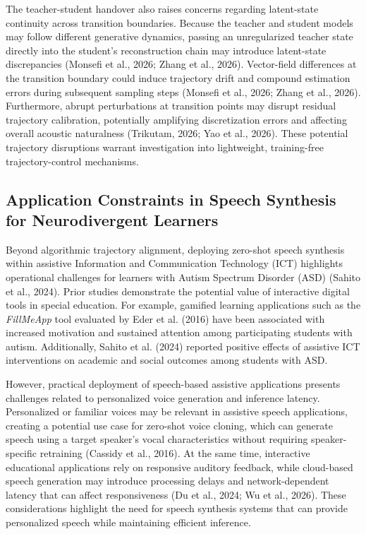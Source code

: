 \documentclass[12pt,a4paper,oneside]{report}
\begin{document}
The teacher-student handover also raises concerns regarding latent-state continuity across transition boundaries. Because the teacher and student models may follow different generative dynamics, passing an unregularized teacher state directly into the student's reconstruction chain may introduce latent-state discrepancies (Monsefi et al., 2026; Zhang et al., 2026). Vector-field differences at the transition boundary could induce trajectory drift and compound estimation errors during subsequent sampling steps (Monsefi et al., 2026; Zhang et al., 2026). Furthermore, abrupt perturbations at transition points may disrupt residual trajectory calibration, potentially amplifying discretization errors and affecting overall acoustic naturalness (Trikutam, 2026; Yao et al., 2026). These potential trajectory disruptions warrant investigation into lightweight, training-free trajectory-control mechanisms.

\subsection{Application Constraints in Speech Synthesis for Neurodivergent Learners}

Beyond algorithmic trajectory alignment, deploying zero-shot speech synthesis within assistive Information and Communication Technology (ICT) highlights operational challenges for learners with Autism Spectrum Disorder (ASD) (Sahito et al., 2024). Prior studies demonstrate the potential value of interactive digital tools in special education. For example, gamified learning applications such as the \emph{FillMeApp }tool evaluated by Eder et al. (2016) have been associated with increased motivation and sustained attention among participating students with autism. Additionally, Sahito et al. (2024) reported positive effects of assistive ICT interventions on academic and social outcomes among students with ASD.

However, practical deployment of speech-based assistive applications presents challenges related to personalized voice generation and inference latency. Personalized or familiar voices may be relevant in assistive speech applications, creating a potential use case for zero-shot voice cloning, which can generate speech using a target speaker's vocal characteristics without requiring speaker-specific retraining (Cassidy et al., 2016). At the same time, interactive educational applications rely on responsive auditory feedback, while cloud-based speech generation may introduce processing delays and network-dependent latency that can affect responsiveness (Du et al., 2024; Wu et al., 2026). These considerations highlight the need for speech synthesis systems that can provide personalized speech while maintaining efficient inference.
\end{document}
